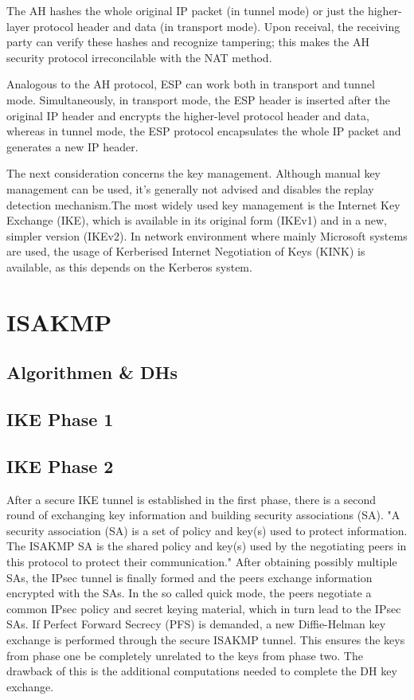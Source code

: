 \documentclass[a4paper]{report}
\begin{document}
The AH hashes the whole original IP packet (in tunnel mode) or just the higher-layer protocol header and data (in transport mode). Upon receival, the receiving party can verify these hashes and recognize tampering; this makes the AH security protocol irreconcilable with the NAT method. \parencite[2-11]{Kent2005AH}

Analogous to the AH protocol, ESP can work both in transport and tunnel mode. Simultaneously, in transport mode, the ESP header is inserted after the original IP header and encrypts the higher-level protocol header and data, whereas in tunnel mode, the ESP protocol encapsulates the whole IP packet and generates a new IP header. \parencite[18-20]{Kent2005ESP}

The next consideration concerns the key management. Although manual key management can be used, it's generally not advised and disables the replay detection mechanism.The most widely used key management is the Internet Key Exchange (IKE), which is available in its original form (IKEv1) and in a new, simpler version (IKEv2). In network environment where mainly Microsoft systems are used, the usage of Kerberised Internet Negotiation of Keys (KINK) is available, as this depends on the Kerberos system. \parencite[4-5]{Bellovin2009}

\section{ISAKMP}
\label{sec:ISAKMP}

\subsection{Algorithmen \& DHs}
\label{ssec:AlgoDH}

\subsection{IKE Phase 1}
\label{ssec:Phase1}

\subsection{IKE Phase 2}
\label{ssec:Phase2}
After a secure IKE tunnel is established in the first phase, there is a second round of exchanging key information and building security associations (SA). "A security association (SA) is a set of policy and key(s) used to protect information. The ISAKMP SA is the shared policy and key(s) used by the negotiating peers in this protocol to protect their communication." \parencite{Harkins1998} After obtaining possibly multiple SAs, the IPsec tunnel is finally formed and the peers exchange information encrypted with the SAs. In the so called quick mode, the peers negotiate a common IPsec policy and secret keying material, which in turn lead to the IPsec SAs. If Perfect Forward Secrecy (PFS) is demanded, a new Diffie-Helman key exchange is performed through the secure ISAKMP tunnel. This ensures the keys from phase one be completely unrelated to the keys from phase two. The drawback of this is the additional computations needed to complete the DH key exchange.
\end{document}
